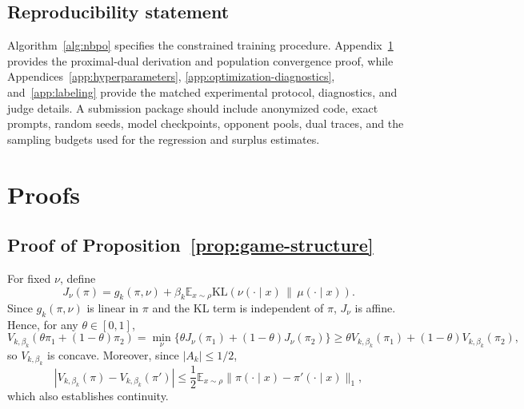 \documentclass{article}
\theoremstyle{remark}
\theoremstyle{plain}
\newcommand{\KL}{\mathrm{KL}}
\newcommand{\E}{\mathbb{E}}
\begin{document}
\subsection*{Reproducibility statement}
Algorithm~\ref{alg:nbpo} specifies the constrained training procedure. Appendix~\ref{app:proofs} provides the proximal-dual derivation and population convergence proof, while Appendices~\ref{app:hyperparameters}, \ref{app:optimization-diagnostics}, and~\ref{app:labeling} provide the matched experimental protocol, diagnostics, and judge details. A submission package should include anonymized code, exact prompts, random seeds, model checkpoints, opponent pools, dual traces, and the sampling budgets used for the regression and surplus estimates.




\appendix

\section{Proofs}
\label{app:proofs}

\subsection{Proof of Proposition~\ref{prop:game-structure}}
\label{app:proof-game-structure}
For fixed $\nu$, define
\[
J_\nu(\pi)
=
g_k(\pi,\nu)
+
\beta_k\E_{x\sim\rho}
\KL\!\left(\nu(\cdot\mid x)\,\|\,\mu(\cdot\mid x)\right).
\]
Since $g_k(\pi,\nu)$ is linear in $\pi$ and the KL term is independent
of $\pi$, $J_\nu$ is affine. Hence, for any $\theta\in[0,1]$,
\[
V_{k,\beta_k}(\theta\pi_1+(1-\theta)\pi_2)
=
\min_\nu
\bigl\{
\theta J_\nu(\pi_1)+(1-\theta)J_\nu(\pi_2)
\bigr\}
\ge
\theta V_{k,\beta_k}(\pi_1)
+
(1-\theta)V_{k,\beta_k}(\pi_2),
\]
so $V_{k,\beta_k}$ is concave. Moreover, since
$|A_k|\le 1/2$,
\[
|V_{k,\beta_k}(\pi)-V_{k,\beta_k}(\pi')|
\le
\frac12\E_{x\sim\rho}
\|\pi(\cdot\mid x)-\pi'(\cdot\mid x)\|_1,
\]
which also establishes continuity.
\end{document}
